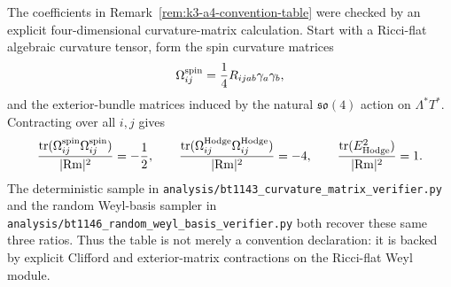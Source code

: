 
\makeatletter
{}
\makeatother
\providecommand{\PSp}{\mathrm{PSp}}
\providecommand{\Aut}{\mathrm{Aut}}
\providecommand{\spec}{\operatorname{spec}}


\begin{remark}
\label{rem:k3-a4-matrix-check}
The coefficients in Remark~\ref{rem:k3-a4-convention-table} were checked by an
explicit four-dimensional curvature-matrix calculation.  Start with a Ricci-flat
algebraic curvature tensor, form the spin curvature matrices
\[
  \Omega^{\rm spin}_{ij}=\frac14 R_{ijab}\gamma_a\gamma_b,
\]
and the exterior-bundle matrices induced by the natural $\mathfrak{so}(4)$
action on $\Lambda^*T^*$.  Contracting over all $i,j$ gives
\[
  \frac{\operatorname{tr}(\Omega^{\rm spin}_{ij}\Omega^{\rm spin}_{ij})}
       {|{\rm Rm}|^2}=-\frac12,
  \qquad
  \frac{\operatorname{tr}(\Omega^{\rm Hodge}_{ij}\Omega^{\rm Hodge}_{ij})}
       {|{\rm Rm}|^2}=-4,
  \qquad
  \frac{\operatorname{tr}(E_{\rm Hodge}^2)}{|{\rm Rm}|^2}=1.
\]
The deterministic sample in \texttt{analysis/bt1143\_curvature\_matrix\_verifier.py}
and the random Weyl-basis sampler in
\texttt{analysis/bt1146\_random\_weyl\_basis\_verifier.py} both recover these
same three ratios.  Thus the table is not merely a convention declaration: it is
backed by explicit Clifford and exterior-matrix contractions on the Ricci-flat
Weyl module.
\end{remark}
